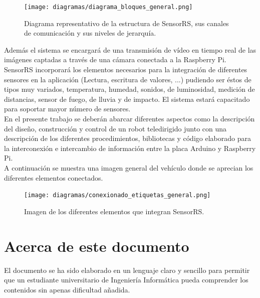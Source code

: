 \begin{figure}[h]
  \begin{center}
    \texttt{[image: diagramas/diagrama\_bloques\_general.png]}
  \end{center}
  \caption{ Diagrama representativo de la estructura de SensorRS, sus canales de comunicación y sus niveles de jerarquía.}
  \label{diagrama:representacion_sistema}
\end{figure}


Además el sistema se encargará de una transmisión de vídeo en tiempo real de las imágenes captadas a través de una cámara conectada a la Raspberry Pi.\\

SensorRS incorporará los elementos necesarios para la integración de diferentes sensores en la aplicación (Lectura, escritura de valores, ...) pudiendo ser éstos de tipos muy
variados, temperatura, humedad, sonidos, de luminosidad, medición de distancias, sensor de fuego, de lluvia y de impacto. El sistema estará capacitado para soportar mayor número
de sensores. \\

En el presente trabajo se deberán abarcar diferentes aspectos como la descripción del diseño, construcción y control de un robot teledirigido junto con una descripción de los 
diferentes procedimientos, bibliotecas y código elaborado para la interconexión e intercambio de información entre la placa Arduino y Raspberry Pi.\\

A continuación se muestra una imagen general del vehículo donde se aprecian los diferentes elementos conectados.\\

\begin{figure}[H]
  \begin{center}
    \texttt{[image: diagramas/conexionado\_etiquetas\_general.png]}
  \end{center}
  \caption{ Imagen de los diferentes elementos que integran SensorRS.}
  \label{diagrama:representacion_sistema}
\end{figure}

\section{Acerca de este documento}

El documento se ha sido elaborado en un lenguaje claro y sencillo para permitir que un estudiante universitario de Ingeniería Informática pueda comprender los contenidos sin apenas dificultad añadida.\\

